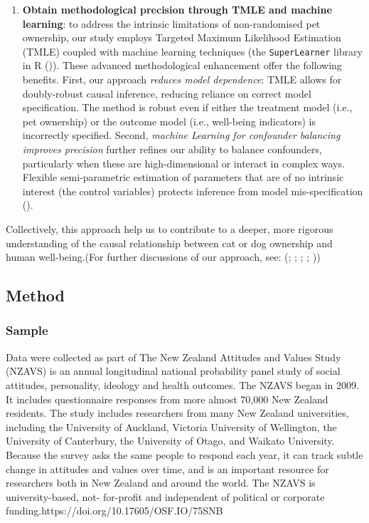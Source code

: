 \documentclass[
  singlecolumn,
  9pt]{article}
\begin{document}
\begin{enumerate}
\item
  \textbf{Obtain methodological precision through TMLE and machine
  learning}: to address the intrinsic limitations of non-randomised pet
  ownership, our study employs Targeted Maximum Likelihood Estimation
  (TMLE) coupled with machine learning techniques (the
  \texttt{SuperLearner} library in R ()). These advanced methodological enhancement offer
  the following benefits. First, our approach \emph{reduces model
  dependence}: TMLE allows for doubly-robust causal inference, reducing
  reliance on correct model specification. The method is robust even if
  either the treatment model (i.e., pet ownership) or the outcome model
  (i.e., well-being indicators) is incorrectly specified. Second,
  \emph{machine Learning for confounder balancing improves precision}
  further refines our ability to balance confounders, particularly when
  these are high-dimensional or interact in complex ways. Flexible
  semi-parametric estimation of parameters that are of no intrinsic
  interest (the control variables) protects inference from model
  mis-specification ().
\end{enumerate}

Collectively, this approach help us to contribute to a deeper, more
rigorous understanding of the causal relationship between cat or dog
ownership and human well-being.(For further discussions of our approach,
see: (;
;
;
;
))

\subsection{Method}\label{method}

\subsubsection{Sample}\label{sample}

Data were collected as part of The New Zealand Attitudes and Values
Study (NZAVS) is an annual longitudinal national probability panel study
of social attitudes, personality, ideology and health outcomes. The
NZAVS began in 2009. It includes questionnaire responses from more
almost 70,000 New Zealand residents. The study includes researchers from
many New Zealand universities, including the University of Auckland,
Victoria University of Wellington, the University of Canterbury, the
University of Otago, and Waikato University. Because the survey asks the
same people to respond each year, it can track subtle change in
attitudes and values over time, and is an important resource for
researchers both in New Zealand and around the world. The NZAVS is
university-based, not- for-profit and independent of political or
corporate funding.https://doi.org/10.17605/OSF.IO/75SNB
\end{document}

